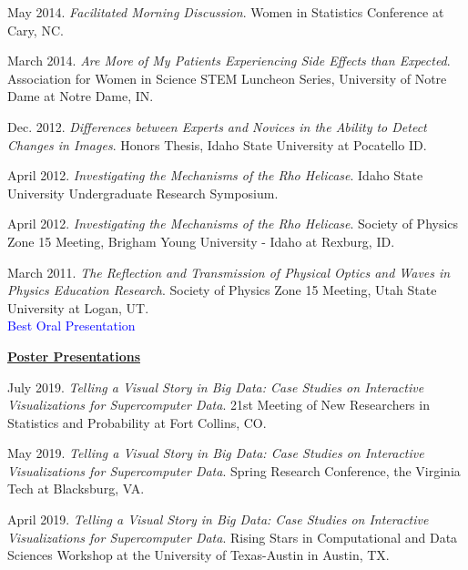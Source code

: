\documentclass[11pt, letterpaper, roman]{moderncv} %
\begin{document}
\begin{etaremune}[topsep=0pt, itemsep=4pt, partopsep=0pt, parsep=0pt]
    \item May 2014. \textit{Facilitated Morning Discussion}. Women in Statistics Conference at Cary, NC.
    
    \item March 2014. \textit{Are More of My Patients Experiencing Side Effects than Expected}. Association for Women in Science STEM Luncheon Series, University of Notre Dame at Notre Dame, IN.
    
    \item Dec. 2012. \textit{Differences between Experts and Novices in the Ability to Detect Changes in Images}. Honors Thesis, Idaho State University at Pocatello ID.
    
    \item April 2012. \textit{Investigating the Mechanisms of the Rho Helicase}. Idaho State University Undergraduate Research Symposium.
    
    \item April 2012. \textit{Investigating the Mechanisms of the Rho Helicase}. Society of Physics Zone 15 Meeting, Brigham Young University - Idaho at Rexburg, ID.
    
    \item March 2011. \textit{The Reflection and Transmission of Physical Optics and Waves in Physics Education Research}. Society of Physics Zone 15 Meeting, Utah State University at Logan, UT.\\
    \textcolor{blue}{Best Oral Presentation}
  
\vspace{8pt}
\hspace{-0.30in}\underline{\textbf{\large Poster Presentations}}\normalsize
    \item July 2019. \textit{Telling a Visual Story in Big Data: Case Studies on Interactive Visualizations for Supercomputer Data}. 21st Meeting of New Researchers in Statistics and Probability at Fort Collins, CO.
    
    \item May 2019. \textit{Telling a Visual Story in Big Data: Case Studies on Interactive Visualizations for Supercomputer Data}. Spring Research Conference, the Virginia Tech at Blacksburg, VA.
    
    \item April 2019. \textit{Telling a Visual Story in Big Data: Case Studies on Interactive Visualizations for Supercomputer Data}. Rising Stars in Computational and Data Sciences Workshop at the University of Texas-Austin in Austin, TX.
    

\end{etaremune}
\end{document}
